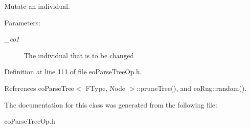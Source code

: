 Mutate an individual. 

\begin{Desc}
\item[Parameters:]
\begin{description}
\item[{\em \_\-eo1}]The individual that is to be changed \end{description}
\end{Desc}


Definition at line 111 of file eo\-Parse\-Tree\-Op.h.

References eo\-Parse\-Tree$<$ FType, Node $>$::prune\-Tree(), and eo\-Rng::random().

The documentation for this class was generated from the following file:\begin{CompactItemize}
\item 
eo\-Parse\-Tree\-Op.h\end{CompactItemize}
